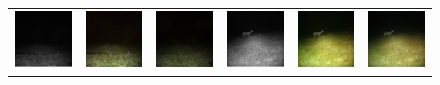 \begin{figure}[htp!]
\begin{tabularx}{\textwidth}{Y Y Y !{\space} Y Y Y}
        \includegraphics{gfx/diffusion-sampling-loss-guided-vs-correction-guided-qual/nir_S2_B06_R3_PICT3848.jpg} & \includegraphics{gfx/diffusion-sampling-loss-guided-vs-correction-guided-qual/diffusion-correction-guided_S2_B06_R3_PICT3848.png} & \includegraphics{gfx/diffusion-sampling-loss-guided-vs-correction-guided-qual/diffusion-loss-guided_S2_B06_R3_PICT3848.png} & \includegraphics{gfx/diffusion-sampling-loss-guided-vs-correction-guided-qual/nir_S2_B07_R1_PICT3274.jpg} & \includegraphics{gfx/diffusion-sampling-loss-guided-vs-correction-guided-qual/diffusion-correction-guided_S2_B07_R1_PICT3274.png} & \includegraphics{gfx/diffusion-sampling-loss-guided-vs-correction-guided-qual/diffusion-loss-guided_S2_B07_R1_PICT3274.png}
    \end{tabularx}
    \caption{
    }
    \label{fig:qualitative-evaluation-loss-guided-vs-correction-guided}
\end{figure}


